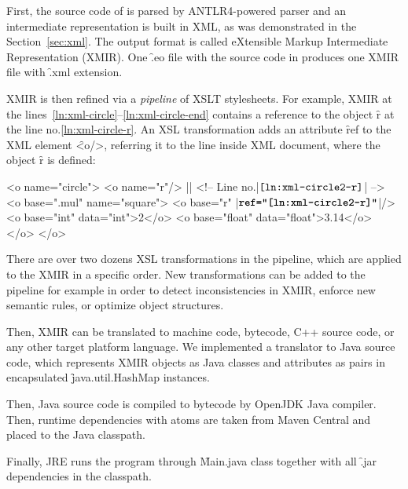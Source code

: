 First, the source code of \eo{} is parsed by ANTLR4-powered
parser and an intermediate representation is built in XML,
as was demonstrated in the Section~\ref{sec:xml}.
The output format is called eXtensible Markup Intermediate Representation (XMIR).
One \f{.eo} file with
the source code in \eo{} produces one XMIR file with \f{.xml} extension.

XMIR is then refined via a \emph{pipeline} of XSLT stylesheets.
For example, XMIR at the
lines~\ref{ln:xml-circle}--\ref{ln:xml-circle-end} contains a
reference to the object \f{r} at the line no.\ref{ln:xml-circle-r}.
An XSL transformation adds an attribute \f{ref} to the XML element \f{<o/>},
referring it to the line inside XML document, where the object \f{r} is defined:

\begin{eocode}
<o name="circle">
  <o name="r"/> |$\label{ln:xml-circle2-r}$| <!-- Line no.|$\texttt{\ref{ln:xml-circle2-r}}$| -->
  <o base=".mul" name="square">
    <o base="r" |$\textbf{\texttt{ref="\ref{ln:xml-circle2-r}"}}$|/>
    <o base="int" data="int">2</o>
    <o base="float" data="float">3.14</o>
  </o>
</o>
\end{eocode}

There are over two dozens XSL transformations in the pipeline, which
are applied to the XMIR in a specific order. New transformations can
be added to the pipeline for example in order to detect inconsistencies
in XMIR, enforce new semantic rules, or optimize object structures.

Then, XMIR can be translated to machine code, bytecode, C++ source code,
or any other target platform language. We implemented
a translator to Java source code, which represents
XMIR objects as Java classes and attributes as pairs in encapsulated
\f{java.util.HashMap} instances.

Then, Java source code is compiled to bytecode by OpenJDK Java compiler.
Then, runtime dependencies with atoms are taken from Maven Central
and placed to the Java classpath.

Finally, JRE runs the program through \f{Main.java} class together with
all \f{.jar} dependencies in the classpath.

